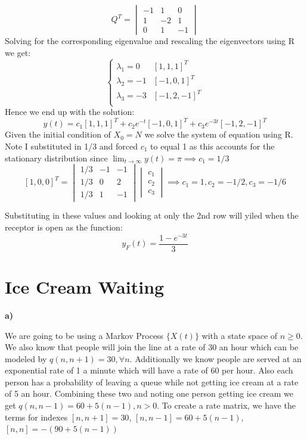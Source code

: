 \documentclass{article}
\begin{document}
\[
Q^T = \begin{vmatrix}
    -1 & 1 & 0\\
    1 & -2 & 1\\
    0 & 1 & -1
\end{vmatrix}
\]
Solving for the corresponding eigenvalue and rescaling the eigenvectors using R we get:
\[
\begin{cases}
    \lambda_1 = 0 & [1,1,1]^T\\
    \lambda_2 = -1 & [-1,0,1]^T\\
    \lambda_3 = -3 & [-1,2,-1]^T\\
\end{cases}
\]
Hence we end up with the solution:
\[
y(t) = c_1[1,1,1]^T + c_2e^{-t}[-1,0,1]^T + c_3e^{-3t}[-1,2,-1]^T
\]
Given the initial condition of $X_0 = N$ we solve the system of equation using R. Note I substituted
in 1/3 and forced $c_1$ to equal 1 as this accounts for the stationary distribution since
$\lim_{t\to \infty}y(t) = \pi \implies c_1 = 1/3$
\[
[1,0,0]^T = \begin{vmatrix}
    1/3 & -1 & -1\\
    1/3 & 0 & 2\\
    1/3 & 1 & -1
\end{vmatrix}\begin{vmatrix}
    c_1\\ c_2\\c_3
\end{vmatrix} \implies c_1 = 1, c_2 = -1/2, c_3 = -1/6
\]

Substituting in these values and looking at only the 2nd row will yiled when the receptor is open
as the function:
\[
y_F(t) = \frac{1-e^{-3t}}{3}
\]

\section{Ice Cream Waiting}
\textbf{a)}

We are going to be using a Markov Process $\{X(t)\}$ with a state space of $n \geq 0$.
We also know that people will join the line at a rate of 30 an hour which can be modeled by
$q(n,n+1) = 30,\forall n$. Additionally we know people are served at an exponential rate of
1 a minute which will have a rate of 60 per hour. Also each person has a probability of leaving
a queue while not getting ice cream at a rate of 5 an hour. Combining these two and noting
one person getting ice cream we get
$q(n,n-1) = 60 + 5(n-1),n>0$. To create a rate matrix, we have the terms for indexes 
$[n,n+1] = 30$, $[n,n-1] = 60 + 5(n-1)$, $[n,n] = -(90 + 5(n-1))$
\end{document}
